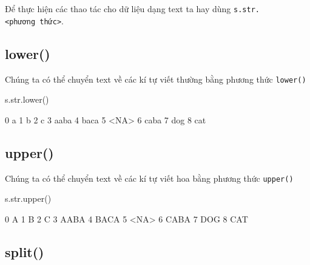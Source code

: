 \documentclass[
]{book}
\newenvironment{Shaded}{\begin{snugshade}}{\end{snugshade}}
\newcommand{\BuiltInTok}[1]{#1}
\newcommand{\NormalTok}[1]{#1}
\begin{document}
Để thực hiện các thao tác cho dữ liệu dạng text ta hay dùng \texttt{s.str.\textless{}phương\ thức\textgreater{}}.

\subsection{lower()}\label{lower}

Chúng ta có thể chuyển text về các kí tự viết thường bằng phương thức \texttt{lower()}

\begin{Shaded}
\begin{Highlighting}[]
\NormalTok{s.}\BuiltInTok{str}\NormalTok{.lower()}
\end{Highlighting}
\end{Shaded}

\begin{Shaded}
\begin{Highlighting}[]
\NormalTok{0       a}
\NormalTok{1       b}
\NormalTok{2       c}
\NormalTok{3    aaba}
\NormalTok{4    baca}
\NormalTok{5    \textless{}NA\textgreater{}}
\NormalTok{6    caba}
\NormalTok{7     dog}
\NormalTok{8     cat}
\end{Highlighting}
\end{Shaded}

\subsection{upper()}\label{upper}

Chúng ta có thể chuyển text về các kí tự viết hoa bằng phương thức \texttt{upper()}

\begin{Shaded}
\begin{Highlighting}[]
\NormalTok{s.}\BuiltInTok{str}\NormalTok{.upper()}
\end{Highlighting}
\end{Shaded}

\begin{Shaded}
\begin{Highlighting}[]
\NormalTok{0       A}
\NormalTok{1       B}
\NormalTok{2       C}
\NormalTok{3    AABA}
\NormalTok{4    BACA}
\NormalTok{5    \textless{}NA\textgreater{}}
\NormalTok{6    CABA}
\NormalTok{7     DOG}
\NormalTok{8     CAT}
\end{Highlighting}
\end{Shaded}

\subsection{split()}\label{split}
\end{document}
